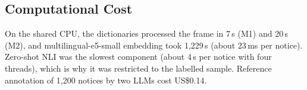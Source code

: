 \subsection{Computational Cost}
On the shared CPU, the dictionaries processed the frame in 7\,s (M1) and 20\,s (M2), and multilingual-e5-small embedding took 1,229\,s (about 23\,ms per notice). Zero-shot NLI was the slowest component (about 4\,s per notice with four threads), which is why it was restricted to the labelled sample. Reference annotation of 1,200 notices by two LLMs cost US\$0.14.

